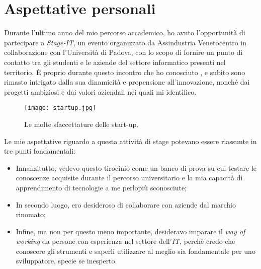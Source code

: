 \section{Aspettative personali}
Durante l'ultimo anno del mio percorso accademico, ho avuto l'opportunità di partecipare a \textit{Stage-IT}, un evento organizzato da Assindustria Venetocentro in collaborazione con l'Università di Padova, con lo scopo di fornire un punto di contatto tra gli studenti e le aziende del settore informatico presenti nel territorio.
\`E proprio durante questo incontro che ho conosciuto \AD , e subito sono rimasto intrigato dalla sua dinamicità e propensione all'innovazione, nonché dai progetti ambiziosi e dai valori aziendali nei quali mi identifico.\\
\begin{figure}[h]
\texttt{[image: startup.jpg]}
\centering
\caption{Le molte sfaccettature delle start-up.} 
\label{fig:tdd}
\end{figure}
Le mie aspettative riguardo a questa attività di stage potevano essere riassunte in tre punti fondamentali:
\begin{itemize}
\item Innanzitutto, vedevo questo tirocinio come un banco di prova su cui testare le conoscenze acquisite durante il percorso universitario e la mia capacità di apprendimento di tecnologie a me perlopiù sconosciute;
\item In secondo luogo, ero desideroso di collaborare con aziende dal marchio rinomato;
\item Infine, ma non per questo meno importante, desideravo imparare il \textit{way of working} da persone con esperienza nel settore dell'\textit{IT}, perchè credo che conoscere gli strumenti e saperli utilizzare al meglio sia fondamentale per uno sviluppatore, specie se inesperto.
\end{itemize}
